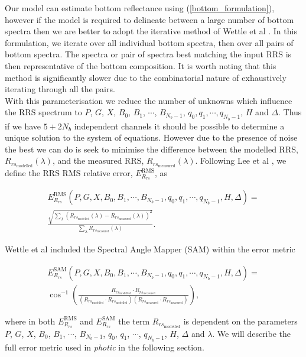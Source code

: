 \documentclass[12pt]{article}
\numberwithin{equation}{section}
\begin{document}
Our model can estimate bottom reflectance using (\ref{bottom_formulation}), however if the 
model is required to delineate between a large number of bottom spectra then we are better to 
adopt the iterative method of Wettle et al \cite{wettle2006}. In this formulation, we iterate over 
all individual bottom spectra, then over all pairs of bottom spectra. The spectra or pair of
spectra best matching the input RRS is then representative of the bottom composition. It is worth 
noting that this method is significantly slower due to the combinatorial nature of exhaustively 
iterating through all the pairs. \\

With this parameterisation we reduce the number of unknowns which influence the RRS spectrum to $P$, 
$G$, $X$, $B_0$, $B_1$, $\cdots$, $B_{N_b-1}$, $q_0, q_1, \cdots, q_{N_b-1}$, $H$ and $\Delta$. Thus if we have 
$5 + 2 N_{b}$ independent channels it should be possible to determine a unique solution to the 
system of equations. However due to the presence of noise the best we can do is seek to minimise 
the difference between the modelled RRS, $R_{rs_{\text{modelled}}}(\lambda)$, and the measured 
RRS, $R_{rs_{\text{measured}}}(\lambda)$. Following Lee et al \cite{lee1998}\cite{lee1999}\cite{lee2001}, 
we define the RRS RMS relative error, $E_{R_{rs}}^{\text{RMS}}$, as 
\begin{linenomath}
\begin{multline}
E_{R_{rs}}^{\text{RMS}}(P, G, X, B_0, B_1, \cdots, B_{N_b-1}, q_0, q_1, \cdots, q_{N_b-1}, H, \Delta) = \\
	\frac{\sqrt{\sum\limits_{\lambda} \left(R_{rs_{\text{modelled}}}(\lambda) - R_{rs_{\text{measured}}}(\lambda)\right)^2}}
	{\sum\limits_{\lambda} R_{rs_{\text{measured}}}(\lambda)}.
\end{multline}
\end{linenomath}

\noindent Wettle et al \cite{wettle2006} included the Spectral Angle Mapper (SAM) 
within the error metric
\begin{linenomath}
\begin{multline*}
E_{R_{rs}}^{\text{SAM}}(P, G, X, B_0, B_1, \cdots, B_{N_b-1}, q_0, q_1, \cdots, q_{N_b-1}, H, \Delta) = \\
\cos^{-1}\left( \frac{R_{rs_{\text{modelled}}} \cdot R_{rs_{\text{measured}}}}
	{\left(R_{rs_{\text{modelled}}} \cdot R_{rs_{\text{modelled}}}\right) \left(R_{rs_{\text{measured}}} \cdot R_{rs_{\text{measured}}}\right)} \right),
\end{multline*}
\end{linenomath}
\noindent where in both $E_{R_{rs}}^{\text{RMS}}$ and $E_{R_{rs}}^{\text{SAM}}$ the 
term $R_{rs_{\text{modelled}}}$ is dependent on the parameters $P$, $G$, $X$, $B_0$, 
$B_1$, $\cdots$, $B_{N_b-1}$, $q_0$, $q_1$, $\cdots$, $q_{N_b-1}$, $H$, $\Delta$ and 
$\lambda$. We will describe the full error metric used in \textit{photic} in the 
following section.
\end{document}
